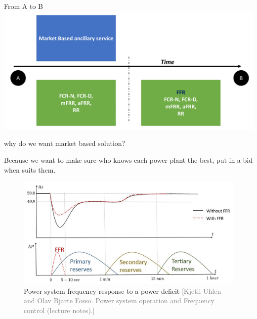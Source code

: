 \documentclass{beamer}
\begin{document}
\begin{frame}{From A to B}
\centering \includegraphics[scale=0.13]{Figures/TimeEvolutionFFR.png}
 {\begin{block}{}
why do we want market based solution?
\end{block} }
 {\begin{alertblock}{}
Because we want to make sure who knows each power plant the best, put in a bid when suits them. 
\end{alertblock} }
\end{frame}


\begin{frame}
\begin{figure}
\includegraphics[scale=1.5]{Figures/FFR1.jpg}
\caption{Power system frequency response to a power deficit \textcolor{gray}{\tiny [Kjetil Uhlen and Olav Bjarte Fosso. Power system operation and Frequency control
(lecture notes).]}}
\end{figure}
\end{frame}
\end{document}
